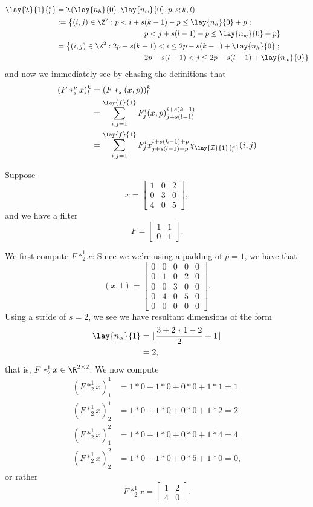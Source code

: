 \begin{align*}
	\lay{\mathcal{I}}{1}{^k_l}&=\mathcal{I}(\lay{n_h}{0},\lay{n_w}{0},p,s;k,l)\\
	&:=\left\{(i,j)\in\Z^2:p<i+s(k-1)-p\leq \lay{n_h}{0}+p\right.; \\
	&\hspace{4cm} \left.p<j+s(l-1)-p\leq \lay{n_w}{0}+p\right\}\\
	&=\left\{(i,j)\in\Z^2:2p-s(k-1)<i\leq 2p-s(k-1)+\lay{n_h}{0}\right.;\\
	&\hspace{4cm}\left.2p-s(l-1)<j\leq 2p-s(l-1)+\lay{n_w}{0}\right\}
\end{align*}
and now we immediately see by chasing the definitions that
\begin{align*}
	(F*_s^px)^k_l&=(F*_s(x,p))^k_l\\
	&=\sum_{i,j=1}^{\lay{f}{1}}F^i_j(x,p)^{i+s(k-1)}_{j+s(l-1)}\\
	&=\sum_{i,j=1}^{\lay{f}{1}}F^i_jx^{i+s(k-1)+p}_{j+s(l-1)-p}\chi_{\lay{\mathcal{I}}{1}{^k_l}}(i,j)
\end{align*}

\begin{ex}
	Suppose
	$$x=\begin{bmatrix}
		1&0&2\\
		0&3&0\\
		4&0&5
	\end{bmatrix},$$
	and we have a filter
	$$F=\begin{bmatrix}
		1&1\\
		0&1
	\end{bmatrix}.$$
	
	We first compute $F*_2^1x$:  Since we we're using a padding of $p=1$, we have that
	$$(x,1)=\begin{bmatrix}
		0&0&0&0&0\\
		0&1&0&2&0\\
		0&0&3&0&0\\
		0&4&0&5&0\\
		0&0&0&0&0
	\end{bmatrix}.$$
	Using a stride of $s=2$, we see we have resultant dimensions of the form
	\begin{align*}
		\lay{n_\alpha}{1}&=\lfloor\frac{3+2*1-2}{2}+1\rfloor\\
		&=2,
	\end{align*}
	that is, $F*_2^1x\in\R^{2\times 2}$.  We now compute
	\begin{align*}
		(F*_2^1x)^1_1&=1*0+1*0+0*0+1*1=1\\
		(F*_2^1x)^1_2&=1*0+1*0+0*0+1*2=2\\
		(F*_2^1x)^2_1&=1*0+1*0+0*0+1*4=4\\
		(F*_2^1x)^2_2&=1*0+1*0+0*5+1*0=0,
	\end{align*}
	or rather
	$$F*_2^1x=\begin{bmatrix}
		1&2\\
		4&0
	\end{bmatrix}.$$
\end{ex}




